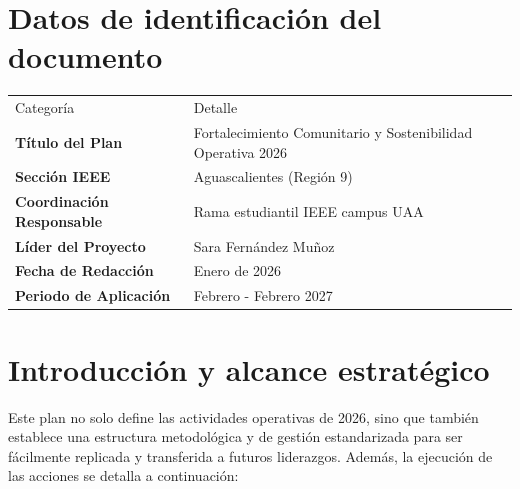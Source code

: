 \documentclass[11pt,a4paper]{article}
\begin{document}
\section{Datos de identificación del documento}

\vspace{0.8cm}


\begin{center}
\begin{tabular}{@{}p{4.5cm} p{8cm}@{}}
    \small Categoría & \small Detalle \\[0.5cm]
    
    \textbf{Título del Plan} & Fortalecimiento Comunitario y Sostenibilidad Operativa 2026 \\[0.5cm]
    
    \textbf{Sección IEEE} & Aguascalientes (Región 9) \\[0.5cm]
    
    \textbf{Coordinación Responsable} & Rama estudiantil IEEE campus UAA \\[0.5cm]
    
    \textbf{Líder del Proyecto} & Sara Fernández Muñoz \\[0.5cm]
    
    \textbf{Fecha de Redacción} & Enero de 2026 \\[0.5cm]
    
    \textbf{Periodo de Aplicación} & Febrero - Febrero 2027 \\[0.5cm]
\end{tabular}
\end{center}


\pagestyle{fancy}
\fancyhf{}
\renewcommand{\headrulewidth}{0pt}
\fancyfoot[C]{\thepage}

\vspace{0.5cm}

\section{Introducción y alcance estratégico}
Este plan no solo define las actividades operativas de 2026, sino que también establece una estructura metodológica y de gestión estandarizada para ser fácilmente replicada y transferida a futuros liderazgos. Además, la ejecución de las acciones se detalla a continuación:
\end{document}
